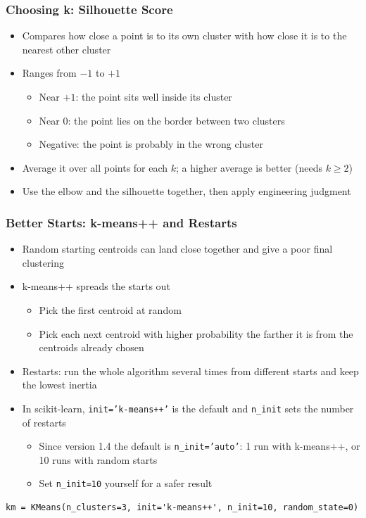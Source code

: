 \begin{frame}[fragile]\frametitle{Choosing k: Silhouette Score}
\begin{itemize}
\item Compares how close a point is to its own cluster with how close it is to the nearest other cluster
\item Ranges from $-1$ to $+1$
\begin{itemize}
\item Near $+1$: the point sits well inside its cluster
\item Near $0$: the point lies on the border between two clusters
\item Negative: the point is probably in the wrong cluster
\end{itemize}
\item Average it over all points for each $k$; a higher average is better (needs $k \ge 2$)
\item Use the elbow and the silhouette together, then apply engineering judgment
\end{itemize}
\end{frame}

\begin{frame}[fragile]\frametitle{Better Starts: k-means++ and Restarts}
\begin{itemize}
\item Random starting centroids can land close together and give a poor final clustering
\item k-means++ spreads the starts out
\begin{itemize}
\item Pick the first centroid at random
\item Pick each next centroid with higher probability the farther it is from the centroids already chosen
\end{itemize}
\item Restarts: run the whole algorithm several times from different starts and keep the lowest inertia
\item In scikit-learn, \texttt{init='k-means++'} is the default and \texttt{n\_init} sets the number of restarts
\begin{itemize}
\item Since version 1.4 the default is \texttt{n\_init='auto'}: 1 run with k-means++, or 10 runs with random starts
\item Set \texttt{n\_init=10} yourself for a safer result
\end{itemize}
\end{itemize}
\begin{lstlisting}
km = KMeans(n_clusters=3, init='k-means++', n_init=10, random_state=0)
\end{lstlisting}
\end{frame}



